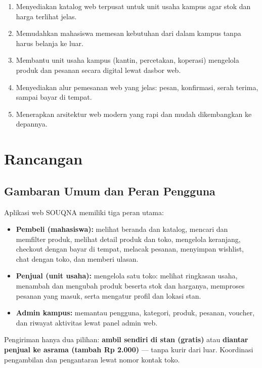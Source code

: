 \documentclass[11pt, a4paper]{article}
\begin{document}
\begin{enumerate}
  \item Menyediakan katalog web terpusat untuk unit usaha kampus agar stok dan harga terlihat jelas.
  \item Memudahkan mahasiswa memesan kebutuhan dari dalam kampus tanpa harus belanja ke luar.
  \item Membantu unit usaha kampus (kantin, percetakan, koperasi) mengelola produk dan pesanan secara digital lewat dasbor web.
  \item Menyediakan alur pemesanan web yang jelas: pesan, konfirmasi, serah terima, sampai bayar di tempat.
  \item Menerapkan arsitektur web modern yang rapi dan mudah dikembangkan ke depannya.
\end{enumerate}

\section{Rancangan}

\subsection{Gambaran Umum dan Peran Pengguna}

Aplikasi web SOUQNA memiliki tiga peran utama:

\begin{itemize}
  \item \textbf{Pembeli (mahasiswa):} melihat beranda dan katalog, mencari dan memfilter produk, melihat detail produk dan toko, mengelola keranjang, checkout dengan bayar di tempat, melacak pesanan, menyimpan wishlist, chat dengan toko, dan memberi ulasan.
  \item \textbf{Penjual (unit usaha):} mengelola satu toko: melihat ringkasan usaha, menambah dan mengubah produk beserta stok dan harganya, memproses pesanan yang masuk, serta mengatur profil dan lokasi stan.
  \item \textbf{Admin kampus:} memantau pengguna, kategori, produk, pesanan, voucher, dan riwayat aktivitas lewat panel admin web.
\end{itemize}

Pengiriman hanya dua pilihan: \textbf{ambil sendiri di stan (gratis)} atau \textbf{diantar penjual ke asrama (tambah Rp 2.000)} --- tanpa kurir dari luar. Koordinasi pengambilan dan pengantaran lewat nomor kontak toko.
\end{document}
